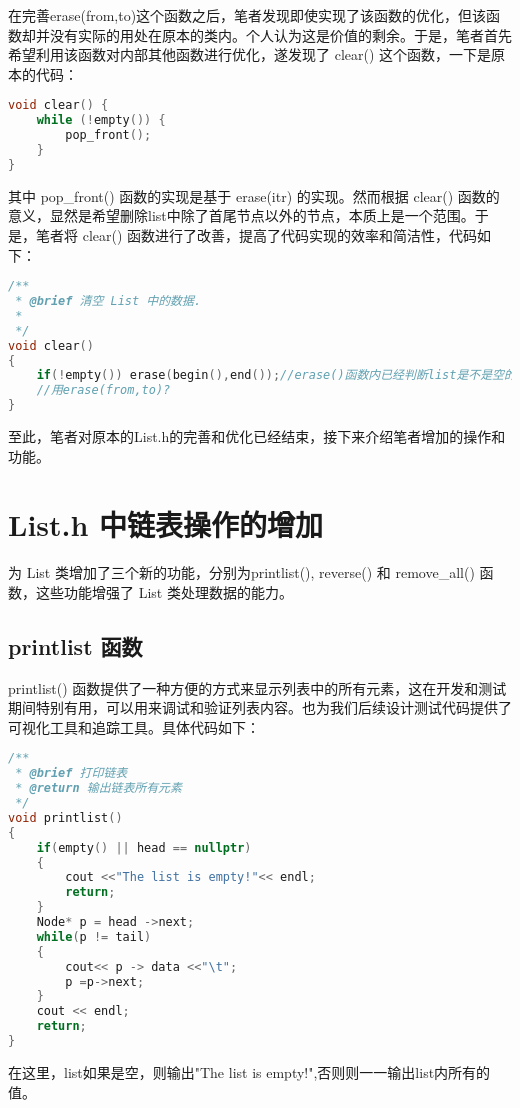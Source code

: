 \documentclass[fontset=fandol]{ctexart}
\begin{document}
在完善erase(from,to)这个函数之后，笔者发现即使实现了该函数的优化，但该函数却并没有实际的用处在原本的类内。个人认为这是价值的剩余。于是，笔者首先希望利用该函数对内部其他函数进行优化，遂发现了 clear() 这个函数，一下是原本的代码：

\begin{lstlisting}[language=C++, caption={clear() origin version}]  
void clear() {  
    while (!empty()) {  
        pop_front();  
    }  
} 
\end{lstlisting}
其中 pop\_front() 函数的实现是基于 erase(itr) 的实现。然而根据 clear() 函数的意义，显然是希望删除list中除了首尾节点以外的节点，本质上是一个范围。于是，笔者将 clear() 函数进行了改善，提高了代码实现的效率和简洁性，代码如下：

\begin{lstlisting}[language=C++, caption={clear() new version}]  
/**
 * @brief 清空 List 中的数据.
 * 
 */
void clear()
{
    if(!empty()) erase(begin(),end());//erase()函数内已经判断list是不是空的情况了
    //用erase(from,to)?
}
\end{lstlisting}

至此，笔者对原本的List.h的完善和优化已经结束，接下来介绍笔者增加的操作和功能。

\section{List.h 中链表操作的增加}  
为 List 类增加了三个新的功能，分别为printlist(), reverse() 和 remove\_all() 函数，这些功能增强了 List 类处理数据的能力。  
  
\subsection{printlist 函数}  
printlist() 函数提供了一种方便的方式来显示列表中的所有元素，这在开发和测试期间特别有用，可以用来调试和验证列表内容。也为我们后续设计测试代码提供了可视化工具和追踪工具。具体代码如下：

\begin{lstlisting}[language=C++, caption={printlist()函数}]  
/**
 * @brief 打印链表
 * @return 输出链表所有元素
 */
void printlist()
{
    if(empty() || head == nullptr) 
    {
        cout <<"The list is empty!"<< endl;
        return;
    }
    Node* p = head ->next;
    while(p != tail)
    {
        cout<< p -> data <<"\t";
        p =p->next;
    }
    cout << endl;
    return;
}

\end{lstlisting}
在这里，list如果是空，则输出"The list is empty!",否则则一一输出list内所有的值。
  
\end{document}
